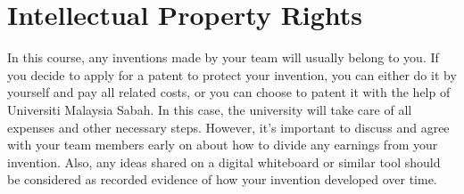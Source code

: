 \section*{Intellectual Property Rights}

In this course, any inventions made by your team will usually belong to you. If you decide to apply for a patent to protect your invention, you can either do it by yourself and pay all related costs, or you can choose to patent it with the help of Universiti Malaysia Sabah. In this case, the university will take care of all expenses and other necessary steps. However, it's important to discuss and agree with your team members early on about how to divide any earnings from your invention. Also, any ideas shared on a digital whiteboard or similar tool should be considered as recorded evidence of how your invention developed over time.


